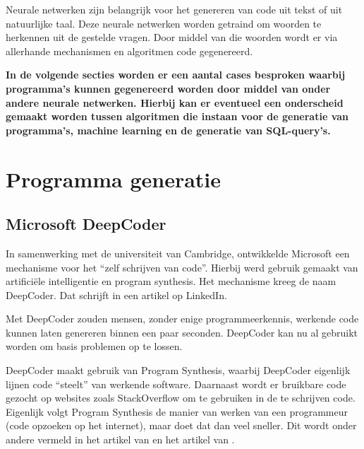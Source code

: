 Neurale netwerken zijn belangrijk voor het genereren van code uit tekst of uit natuurlijke taal. Deze neurale netwerken worden getraind om woorden te herkennen uit de gestelde vragen. Door middel van die woorden wordt er via allerhande mechanismen en algoritmen code gegenereerd.

\textbf{In de volgende secties worden er een aantal cases besproken waarbij programma's kunnen gegenereerd worden door middel van onder andere neurale netwerken. Hierbij kan er eventueel een onderscheid gemaakt worden tussen algoritmen die instaan voor de generatie van programma's, machine learning en de generatie van SQL-query's.}

\section{Programma generatie}

\subsection{Microsoft DeepCoder}

In samenwerking met de universiteit van Cambridge, ontwikkelde Microsoft een mechanisme voor het “zelf schrijven van code”. Hierbij werd gebruik gemaakt van artificiële intelligentie en program synthesis. Het mechanisme kreeg de naam DeepCoder. Dat schrijft \textcite{DeepCoder} in een artikel op LinkedIn.

Met DeepCoder zouden mensen, zonder enige programmeerkennis, werkende code kunnen laten genereren binnen een paar seconden. DeepCoder kan nu al gebruikt worden om basis problemen op te lossen.

DeepCoder maakt gebruik van Program Synthesis, waarbij DeepCoder eigenlijk lijnen code “steelt” van werkende software. Daarnaast wordt er bruikbare code gezocht op websites zoals StackOverflow om te gebruiken in de te schrijven code. Eigenlijk volgt Program Synthesis de manier van werken van een programmeur (code opzoeken op het internet), maar doet dat dan veel sneller. Dit wordt onder andere vermeld in het artikel van \textcite{techcrunch} en het artikel van \textcite{NewScientist}.

